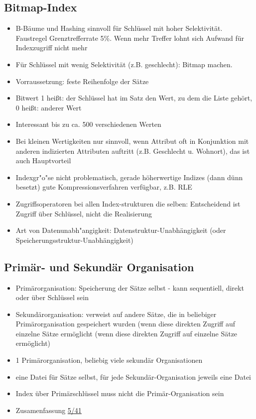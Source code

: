 \documentclass[a4paper, 12pt]{scrartcl}
\begin{document}
\subsection{Bitmap-Index}
\begin{itemize}
	\item
		B-Bäume und Hashing sinnvoll für Schlüssel mit hoher Selektivität. Faustregel Grenztrefferrate 5\%. Wenn mehr Treffer lohnt sich Aufwand für Indexzugriff nicht mehr
	\item
		Für Schlüssel mit wenig Selektivität (z.B. geschlecht): Bitmap machen.
	\item
		Vorraussetzung: feste Reihenfolge der Sätze
	\item
		Bitwert 1 heißt: der Schlüssel hat im Satz den Wert, zu dem die Liste gehört, 0 heißt: anderer Wert
	\item
		Interessant bis zu ca. 500 verschiedenen Werten
	\item
		Bei kleinen Wertigkeiten nur sinnvoll, wenn Attribut oft in Konjunktion mit anderen indizierten Attributen auftritt (z.B. Geschlecht u. Wohnort), das ist auch Hauptvorteil
	\item
		Indexgr"o"se nicht problematisch, gerade höherwertige Indizes (dann dünn besetzt) gute Kompressionsverfahren verfügbar, z.B. RLE
	\item
		Zugriffsoperatoren bei allen Index-strukturen die selben: Entscheidend ist Zugriff über Schlüssel, nicht die Realisierung
	\item
		Art von Datenunabh"angigkeit: Datenstruktur-Unabhängigkeit  (oder Speicherungsstruktur-Unabhängigkeit)
\end{itemize}

\subsection{Primär- und Sekundär Organisation}
\begin{itemize}
	\item
		Primärorganisation: Speicherung der Sätze selbst - kann sequentiell, direkt oder über Schlüssel sein
	\item
		Sekundärorganisation: verweist auf andere Sätze, die in beliebiger Primärorganisation gespeichert wurden (wenn diese direkten Zugriff auf einzelne Sätze ermöglicht (wenn diese direkten Zugriff auf einzelne Sätze ermöglicht)
	\item
		1 Primärorganisation, beliebig viele sekundär Organisationen
	\item
		eine Datei für Sätze selbst, für jede Sekundär-Organisation jeweils eine Datei
	\item
		Index über Primärschlüssel muss nicht die Primär-Organisation sein
	\item
		Zusamenfassung \href{run:IDB-2015WS-05-Schluessel-Teil-2.pdf}{5/41}
\end{itemize}
\end{document}
